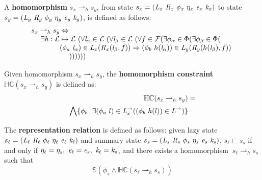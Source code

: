 \begin{definition}
\label{def:homomorphism}
A \textbf{homomorphism} $s_x \rightharpoonup_{h} s_y$, from state $s_x = ( \cfgnt{L}_x\ \cfgnt{R}_x\ \phi_x\ \eta_x\ \cfgnt{e}_x\ \cfgnt{k}_x )$ to state $s_y = ( \cfgnt{L}_y\ \cfgnt{R}_y\ \phi_y\ \eta_y\ \cfgnt{e}_y\ \cfgnt{k}_y )$, is defined as follows: 
$$
\begin{array}{l}
 s_x \rightharpoonup_{h} s_y \Leftrightarrow \\
\ \ \ \ \exists h: \mathcal{L} \mapsto \mathcal{L}\ (\forall \cfgnt{l}_\alpha \in \mathcal{L}\ (\forall \cfgnt{l}_\beta \in \mathcal{L}\ ( \forall f \in \mathcal{F}( \exists \phi_\alpha \in \Phi(\exists \phi_\beta \in \Phi( \\ 
\ \ \ \ \ \ \ \ \ \ \ \ (\phi_a\ \cfgnt{l}_\alpha) \in \cfgnt{L}_x(\cfgnt{R}_x (\cfgnt{l}_\beta,f )) \Rightarrow (\phi_b\ h(\cfgnt{l}_\alpha))\in \cfgnt{L}_y(\cfgnt{R}_y (h(\cfgnt{l}_\beta),f ))\ \\
\ \ \ \ \ \ \ \ \ \ \ \ \ \ \ \  )) ) ) ) )
\end{array}
$$
\end{definition}

\begin{definition}
\label{def:hc}
Given homomorphism $s_x \rightharpoonup_{h} s_y$, the \textbf{homomorphism constraint} $\mathbb{HC}(s_x \rightharpoonup_{h} s_y)$ is defined as:
\begin{align*}
\mathbb{HC}(s_x \rightharpoonup_{h} s_y) &= \\
 \bigwedge \{ \phi_b\ | \exists (\phi_a\ l) \in \emph{L}_x^\rightarrow ( (\phi_b\ h(l)) \in \emph{L}^\rightarrow)\} 
\end{align*}
\end{definition}

\begin{definition}
\label{representation}
The \textbf{representation relation} is defined as follows: given lazy state $s_\ell = ( \cfgnt{L}_\ell\ \cfgnt{R}_\ell\ \phi_\ell\ \eta_\ell\ \cfgnt{e}_\ell\ \cfgnt{k}_\ell )$ and summary state $s_s = ( \emph{L}_s\ \emph{R}_s\ \phi_s\ \eta_s\ \emph{e}_s\ \emph{k}_s )$, $s_\ell \sqsubset s_s $ if and only if $\eta_{\ell} = \eta_{s} ,\ \cfgnt{e}_{\ell} = \cfgnt{e}_{s} ,\ \cfgnt{k}_{\ell} = \cfgnt{k}_{s}$, and there exists a homomorphism $\ s_\ell \rightharpoonup_{h} s_s $ such that 
\begin{equation}
\label{eqn:valid}
 \mathbb{S}( \phi_s \wedge \mathbb{HC}(s_\ell \rightharpoonup_{h} s_s) ) 
\end{equation}
\end{definition}

